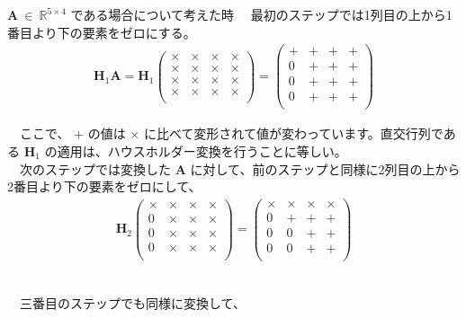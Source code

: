 \documentclass[dvipdfmx,10pt,presentation]{beamer}
\begin{document}
\begin{frame}[allowframebreaks]{\(\bm{A}\ \in\ \mathbb{R}^{5\times4}\) である場合について考えた時}
　最初のステップでは1列目の上から1番目より下の要素をゼロにする。\\

\begin{align*}
\bm{H}_1\bm{A} = \bm{H}_1
\begin{pmatrix}
\times & \times & \times & \times \\
\times & \times & \times & \times \\
\times & \times & \times & \times \\
\times & \times & \times & \times \\
\end{pmatrix}
=
\begin{pmatrix}
+ & + & + & + \\
0 & + & + & + \\
0 & + & + & + \\
0 & + & + & + \\
\end{pmatrix}
\end{align*}

　ここで、 \(+\) の値は \(\times\) に比べて変形されて値が変わっています。直交行列である \(\bm{H}_1\) の適用は、ハウスホルダー変換を行うことに等しい。\\

　次のステップでは変換した \(\bm{A}\) に対して、前のステップと同様に2列目の上から2番目より下の要素をゼロにして、\\

\begin{align*}
\bm{H}_2
\begin{pmatrix}
\times & \times & \times & \times \\
0 & \times & \times & \times \\
0 & \times & \times & \times \\
0 & \times & \times & \times \\
\end{pmatrix}
=
\begin{pmatrix}
\times & \times & \times & \times \\
0 & + & + & + \\
0 & 0 & + & + \\
0 & 0 & + & + \\
\end{pmatrix}
\end{align*}


\framebreak\\
　三番目のステップでも同様に変換して、\\


\end{frame}
\end{document}

